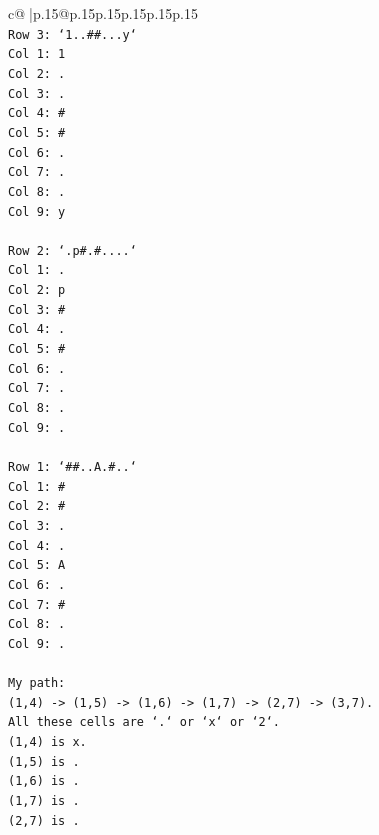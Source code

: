\documentclass{article}
\begin{document}
{\begin{supertabular}{c@{$\;$}|p{.15\linewidth}@{}p{.15\linewidth}p{.15\linewidth}p{.15\linewidth}p{.15\linewidth}p{.15\linewidth}}
{{{\\ 
\texttt{Row 3: `1..\#\#...y`} \\
\texttt{Col 1: 1} \\
\texttt{Col 2: .} \\
\texttt{Col 3: .} \\
\texttt{Col 4: \#} \\
\texttt{Col 5: \#} \\
\texttt{Col 6: .} \\
\texttt{Col 7: .} \\
\texttt{Col 8: .} \\
\texttt{Col 9: y} \\
\\ 
\texttt{Row 2: `.p\#.\#....`} \\
\texttt{Col 1: .} \\
\texttt{Col 2: p} \\
\texttt{Col 3: \#} \\
\texttt{Col 4: .} \\
\texttt{Col 5: \#} \\
\texttt{Col 6: .} \\
\texttt{Col 7: .} \\
\texttt{Col 8: .} \\
\texttt{Col 9: .} \\
\\ 
\texttt{Row 1: `\#\#..A.\#..`} \\
\texttt{Col 1: \#} \\
\texttt{Col 2: \#} \\
\texttt{Col 3: .} \\
\texttt{Col 4: .} \\
\texttt{Col 5: A} \\
\texttt{Col 6: .} \\
\texttt{Col 7: \#} \\
\texttt{Col 8: .} \\
\texttt{Col 9: .} \\
\\ 
\texttt{My path:} \\
\texttt{(1,4) {-}> (1,5) {-}> (1,6) {-}> (1,7) {-}> (2,7) {-}> (3,7).} \\
\texttt{All these cells are `.` or `x` or `2`.} \\
\texttt{(1,4) is x.} \\
\texttt{(1,5) is .} \\
\texttt{(1,6) is .} \\
\texttt{(1,7) is .} \\
\texttt{(2,7) is .} \\
}}}
\end{supertabular}}
\end{document}
